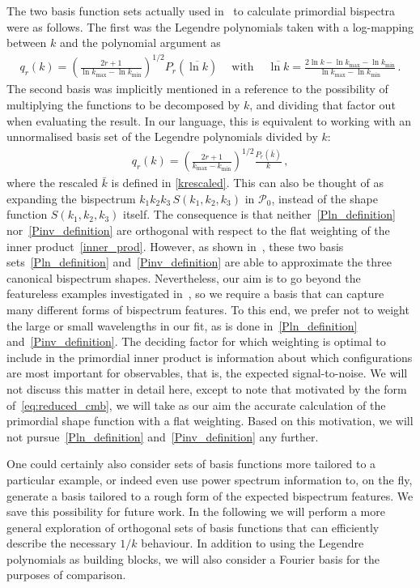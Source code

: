 \documentclass[a4paper,12pt]{extarticle}
\newcommand{\kbar}{\bar{k}}
\newcommand{\Lbasic}{\mathcal{P}_0}
\newcommand{\kmin}{{k_\text{min}}}
\newcommand{\kmax}{{k_\text{max}}}
\begin{document}
The two basis function sets actually used in~\cite{Funakoshi} to calculate primordial bispectra were as follows.
The first was the Legendre polynomials taken with a log-mapping
between $k$ and the polynomial argument as 
\begin{align}\label{Pln_definition}
    q_{r}(k) = \left(\frac{2r+1} {\ln\kmax - \ln\kmin}\right)^{1/2} P_r\left(\overline {\ln k}\right)\quad~ \text{with}\quad~ \overline {\ln k}=\frac{2\ln k-\ln\kmax-\ln\kmin}{\ln\kmax-\ln\kmin}\,.
\end{align}  
The second basis was implicitly mentioned in a reference to the possibility of multiplying the functions
to be decomposed by $k$, and dividing that factor out when evaluating
the result.
In our language, this is equivalent to working with an unnormalised 
basis set of
the Legendre polynomials divided by $k$:
\begin{align}\label{Pinv_definition}
        q_{r}(k) = \left(\frac{2r+1} {\kmax - \kmin}\right)^{1/2} \frac{P_r(\kbar)}{k}\,,
\end{align}
where the rescaled $\kbar$ is defined in \eqref{krescaled}.
This can also be thought of as expanding the bispectrum $k_1k_2k_3\,S(k_1,k_2,k_3)$ in $\Lbasic$,
instead of the shape function $S(k_1,k_2,k_3)$ itself. The consequence is that neither~\eqref{Pln_definition} nor~\eqref{Pinv_definition}
are orthogonal with respect to the flat weighting of the inner product~\eqref{inner_prod}.   However, as shown in~\cite{Funakoshi},
these two basis sets~\eqref{Pln_definition} and~\eqref{Pinv_definition}
are able to approximate the three canonical bispectrum shapes.   Nevertheless, our aim is to go beyond the featureless examples investigated in~\cite{Funakoshi},
so we require a basis that can capture many different forms of bispectrum features.
To this end, we prefer not to weight the large or small wavelengths in our fit,
as is done in~\eqref{Pln_definition} and~\eqref{Pinv_definition}.
The deciding factor for which weighting is optimal to include in the primordial inner product
is information about which configurations are most important for observables, that is, the expected signal-to-noise.
We will not discuss this matter in detail here, except to note that
motivated by the form of~\eqref{eq:reduced_cmb}, we will take as our aim the
accurate calculation of the primordial shape function with a flat weighting.
Based on this motivation, we will not pursue~\eqref{Pln_definition}
and~\eqref{Pinv_definition} any further.


One could certainly also consider sets of basis functions more tailored to a particular example,
or indeed even use power spectrum information to, on the fly,
generate a basis tailored to a rough form of the expected bispectrum features.
We save this possibility for future work.
In the following we will perform a more general exploration of orthogonal sets of basis functions that can
efficiently describe the necessary $1/k$ behaviour.
In addition to using the Legendre polynomials as building blocks,
we will also consider a Fourier basis for the purposes of comparison.
\end{document}
